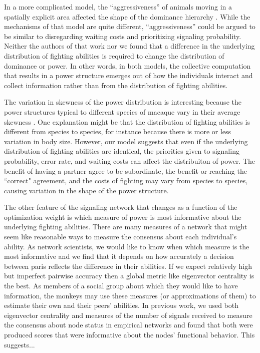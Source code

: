 \documentclass{article}
\begin{document}
In a more complicated model, the ``aggressiveness'' of animals moving in a spatially explicit area affected the shape of the dominance hierarchy \cite{Hemelrijk:2011fk}.  While the mechanisms of that model are quite different, ``aggressiveness'' could be argued to be similar to disregarding waiting costs and prioritizing signaling probability.  Neither the authors of that work nor we found that a difference in the underlying distribution of fighting abilities is required to change the distribution of dominance or power.  In other words, in both models, the collective computation that results in a power structure emerges out of how the individuals interact and collect information rather than from the distribution of fighting abilities. 

The variation in skewness of the power distribution is interesting because the power structures typical to different species of macaque vary in their average skewness \cite{Flack:2004oq,Preuschoft:2004ly,Waal:1985fk}.  One explanation might be that the distribution of fighting abilities is different from species to species, for instance because there is more or less variation in body size.  However, our model suggests that even if the underlying distribution of fighting abilities are identical, the priorities given to signaling probability, error rate, and waiting costs can affect the distribuiton of power.  The benefit of having a partner agree to be subordinate, the benefit or reaching the ``correct" agreement, and the costs of fighting may vary from species to species, causing variation in the shape of the power structure.

The other feature of the signaling network that changes as a function of the optimization weight is which measure of power is most informative about the underlying fighting abilities.  There are many measures of a network that might seem like reasonable ways to measure the consensus about each individual's ability.  As network scientists, we would like to know when which measure is the most informative and we find that it depends on how accurately a decision between paris reflects the difference in their abilities.  If we expect relatively high but imperfect pairwise accuracy then a global metric like eigenvector centrality is the best.  As members of a social group about which they would like to have information, the monkeys may use these measures (or approximations of them) to estimate their own and their peers' abilities.  In previous work, we used both eigenvector centrality and measures of the number of signals received to measure the consensus about node status in empirical networks and found that both were produced scores that were informative about the nodes' functional behavior.  This suggests... %
 
\end{document}
